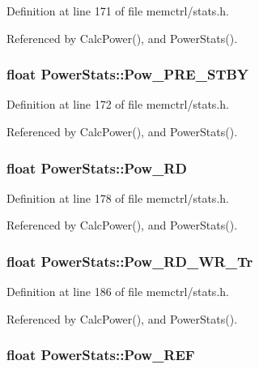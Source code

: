 Definition at line 171 of file memctrl/stats.h.

Referenced by CalcPower(), and PowerStats().
\subsubsection[{Pow\_\-PRE\_\-STBY}]{\setlength{\rightskip}{0pt plus 5cm}float {\bf PowerStats::Pow\_\-PRE\_\-STBY}}\label{classPowerStats_e0f798ed2ff0b7e6a06e141f404b3be7}




Definition at line 172 of file memctrl/stats.h.

Referenced by CalcPower(), and PowerStats().
\subsubsection[{Pow\_\-RD}]{\setlength{\rightskip}{0pt plus 5cm}float {\bf PowerStats::Pow\_\-RD}}\label{classPowerStats_06a235bf85d39668b4af9000face1d23}




Definition at line 178 of file memctrl/stats.h.

Referenced by CalcPower(), and PowerStats().
\subsubsection[{Pow\_\-RD\_\-WR\_\-Tr}]{\setlength{\rightskip}{0pt plus 5cm}float {\bf PowerStats::Pow\_\-RD\_\-WR\_\-Tr}}\label{classPowerStats_3597bcdd55268d0126c8b5565708bf67}




Definition at line 186 of file memctrl/stats.h.

Referenced by CalcPower(), and PowerStats().
\subsubsection[{Pow\_\-REF}]{\setlength{\rightskip}{0pt plus 5cm}float {\bf PowerStats::Pow\_\-REF}}\label{classPowerStats_95f53e555c3930005975a894b341294e}




